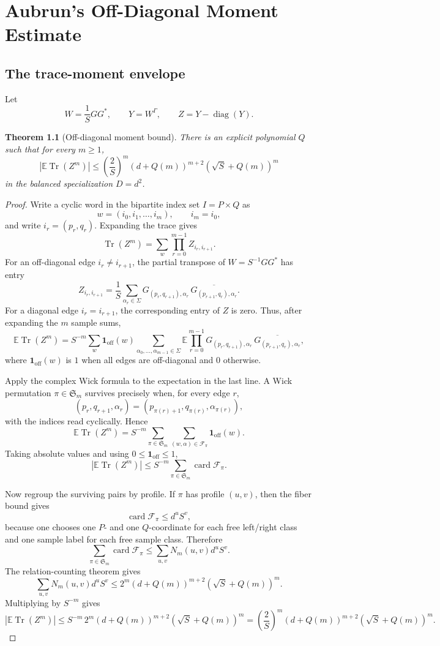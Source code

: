 \documentclass[11pt,oneside]{book}
\newtheorem{theorem}{Theorem}[chapter]
\DeclareMathOperator{\Tr}{Tr}
\DeclareMathOperator{\diag}{diag}
\DeclareMathOperator{\card}{card}
\newcommand{\E}{\mathbb E}
\newcommand{\1}{\mathbf 1}
\newcommand{\GammaPT}{\Gamma}
\begin{document}
\chapter{Aubrun's Off-Diagonal Moment Estimate}

\section{The trace-moment envelope}

Let
\[
  W=\frac1S GG^*,\qquad
  Y=W^{\GammaPT},\qquad
  Z=Y-\diag(Y).
\]

\begin{theorem}[Off-diagonal moment bound]
There is an explicit polynomial \(Q\) such that for every \(m\ge1\),
\[
  \left|\E\Tr(Z^m)\right|
  \le
  \left(\frac2S\right)^m
  (d+Q(m))^{m+2}(\sqrt S+Q(m))^m
\]
in the balanced specialization \(D=d^2\).
\end{theorem}

\begin{proof}
Write a cyclic word in the bipartite index set \(I=P\times Q\) as
\[
  w=(i_0,i_1,\ldots,i_m),\qquad i_m=i_0,
\]
and write \(i_r=(p_r,q_r)\).  Expanding the trace gives
\[
  \Tr(Z^m)
  =
  \sum_{w}
  \prod_{r=0}^{m-1} Z_{i_r,i_{r+1}} .
\]
For an off-diagonal edge \(i_r\ne i_{r+1}\), the partial transpose of
\(W=S^{-1}GG^*\) has entry
\[
  Z_{i_r,i_{r+1}}
  =
  \frac1S
  \sum_{\alpha_r\in\Sigma}
  G_{(p_r,q_{r+1}),\alpha_r}\,
  \overline{G_{(p_{r+1},q_r),\alpha_r}}.
\]
For a diagonal edge \(i_r=i_{r+1}\), the corresponding entry of \(Z\) is
zero.  Thus, after expanding the \(m\) sample sums,
\[
  \E\Tr(Z^m)
  =
  S^{-m}
  \sum_w \mathbf 1_{\mathrm{off}}(w)
  \sum_{\alpha_0,\ldots,\alpha_{m-1}\in\Sigma}
  \E\prod_{r=0}^{m-1}
  G_{(p_r,q_{r+1}),\alpha_r}\,
  \overline{G_{(p_{r+1},q_r),\alpha_r}},
\]
where \(\mathbf 1_{\mathrm{off}}(w)\) is \(1\) when all edges are
off-diagonal and \(0\) otherwise.

Apply the complex Wick formula to the expectation in the last line.  A Wick
permutation \(\pi\in\mathfrak S_m\) survives precisely when, for every
edge \(r\),
\[
  (p_r,q_{r+1},\alpha_r)
  =
  (p_{\pi(r)+1},q_{\pi(r)},\alpha_{\pi(r)}),
\]
with the indices read cyclically.  Hence
\[
  \E\Tr(Z^m)
  =
  S^{-m}
  \sum_{\pi\in\mathfrak S_m}
  \sum_{(w,\alpha)\in\mathcal F_\pi}
  \mathbf 1_{\mathrm{off}}(w).
\]
Taking absolute values and using \(0\le\mathbf 1_{\mathrm{off}}\le1\),
\[
  \left|\E\Tr(Z^m)\right|
  \le
  S^{-m}\sum_{\pi\in\mathfrak S_m}\card\mathcal F_\pi.
\]

Now regroup the surviving pairs by profile.  If \(\pi\) has profile
\((u,v)\), then the fiber bound gives
\[
  \card\mathcal F_\pi\le d^uS^v,
\]
because one chooses one \(P\)- and one \(Q\)-coordinate for each free
left/right class and one sample label for each free sample class.  Therefore
\[
  \sum_{\pi\in\mathfrak S_m}\card\mathcal F_\pi
  \le
  \sum_{u,v}N_m(u,v)d^uS^v.
\]
The relation-counting theorem gives
\[
  \sum_{u,v}N_m(u,v)d^uS^v
  \le
  2^m(d+Q(m))^{m+2}(\sqrt S+Q(m))^m.
\]
Multiplying by \(S^{-m}\) gives
\[
  \left|\E\Tr(Z^m)\right|
  \le
  S^{-m}\,2^m(d+Q(m))^{m+2}(\sqrt S+Q(m))^m
  =
  \left(\frac2S\right)^m
  (d+Q(m))^{m+2}(\sqrt S+Q(m))^m.
\]
\end{proof}
\end{document}
